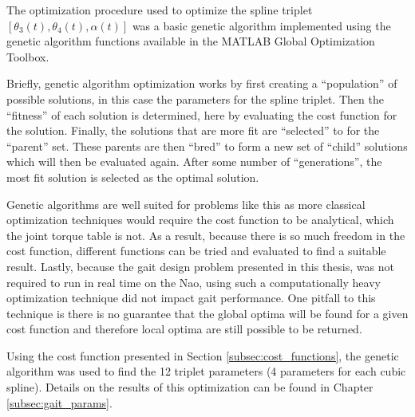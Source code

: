The optimization procedure used to optimize the spline triplet $[\theta_3(t), \theta_4(t), \alpha(t)]$
was a basic genetic algorithm implemented using the genetic algorithm functions available in the MATLAB 
Global Optimization Toolbox. 

Briefly, genetic algorithm optimization works by first creating a ``population'' of
possible solutions, in this case the parameters for the spline triplet. Then the ``fitness'' of each solution
is determined, here by evaluating the cost function for the solution. Finally, the solutions that are more fit
are ``selected'' to for the ``parent'' set. These parents are then ``bred'' to form a new set of ``child'' solutions
which will then be evaluated again. After some number of ``generations'', the most fit solution is selected
as the optimal solution.

Genetic algorithms are well suited for problems like this as more classical optimization techniques
would require the cost function to be analytical, which the joint torque table is not.
As a result, because there is so much freedom in the cost function, different functions can be tried
and evaluated to find a suitable result.
Lastly, because the gait design problem presented in this thesis, was not required to run in real time on the
Nao, using such a computationally heavy optimization technique did not impact gait performance.
One pitfall to this technique is there is no guarantee that the global optima will be found for
a given cost function and therefore local optima are still possible to be returned.

Using the cost function presented in Section \ref{subsec:cost_functions}, the genetic algorithm was used
to find the 12 triplet parameters (4 parameters for each cubic spline). %
Details on the results of this optimization can be found in Chapter \ref{subsec:gait_params}.